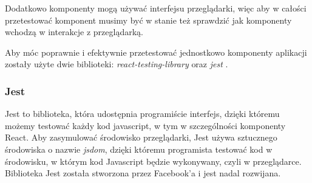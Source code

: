 Dodatkowo komponenty mogą używać interfejsu przeglądarki, więc aby w całości przetestować komponent musimy być w stanie też sprawdzić jak komponenty wchodzą w interakcje z przeglądarką.

Aby móc poprawnie i efektywnie przetestować jednostkowo komponenty aplikacji zostały użyte dwie biblioteki: \emph{react-testing-library} \cite{ref_rtl_doc} oraz \emph{jest} \cite{ref_jest_doc}.

\subsubsection{Jest} Jest to biblioteka, która udostępnia programiście interfejs, dzięki któremu możemy testować każdy kod javascript, w tym w szczególności komponenty React. Aby zasymulować środowisko przeglądarki, Jest używa sztucznego środowiska o nazwie \emph{jsdom}, dzięki któremu programista testować kod w środowisku, w którym kod Javascript będzie wykonywany, czyli w przeglądarce. Biblioteka Jest została stworzona przez Facebook'a i jest nadal rozwijana.

